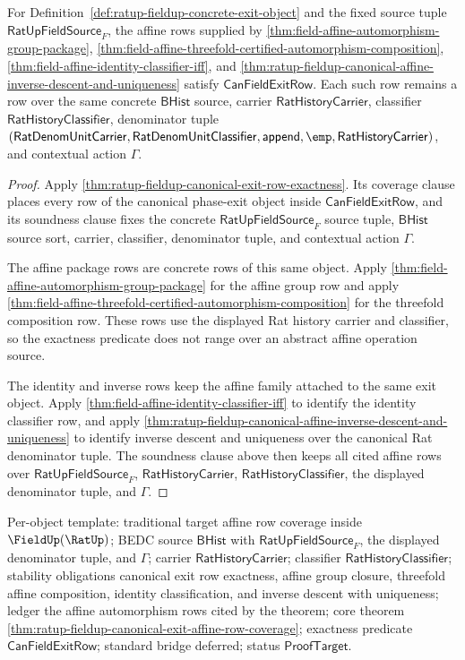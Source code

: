 \begin{theorem}
\label{thm:ratup-fieldup-canonical-exit-affine-row-coverage}
For Definition~\ref{def:ratup-fieldup-concrete-exit-object} and the fixed
source tuple $\mathsf{RatUpFieldSource}_F$, the affine rows supplied by
\autoref{thm:field-affine-automorphism-group-package},
\autoref{thm:field-affine-threefold-certified-automorphism-composition},
\autoref{thm:field-affine-identity-classifier-iff}, and
\autoref{thm:ratup-fieldup-canonical-affine-inverse-descent-and-uniqueness}
satisfy $\mathsf{CanFieldExitRow}$. Each such row remains a row over the same
concrete $\mathsf{BHist}$ source, carrier $\mathsf{RatHistoryCarrier}$,
classifier $\mathsf{RatHistoryClassifier}$, denominator tuple
$(\mathsf{RatDenomUnitCarrier},\mathsf{RatDenomUnitClassifier},
\mathsf{append},\emp,\mathsf{RatHistoryCarrier})$, and contextual action
$\Gamma$.
\end{theorem}
\begin{proof}
Apply \autoref{thm:ratup-fieldup-canonical-exit-row-exactness}. Its coverage
clause places every row of the canonical phase-exit object inside
$\mathsf{CanFieldExitRow}$, and its soundness clause fixes the concrete
$\mathsf{RatUpFieldSource}_F$ source tuple, $\mathsf{BHist}$ source sort, carrier,
classifier, denominator tuple, and contextual action $\Gamma$.

The affine package rows are concrete rows of this same object. Apply
\autoref{thm:field-affine-automorphism-group-package} for the affine group row
and apply
\autoref{thm:field-affine-threefold-certified-automorphism-composition} for the
threefold composition row. These rows use the displayed Rat history carrier and
classifier, so the exactness predicate does not range over an abstract affine
operation source.

The identity and inverse rows keep the affine family attached to the same exit
object. Apply \autoref{thm:field-affine-identity-classifier-iff} to identify the
identity classifier row, and apply
\autoref{thm:ratup-fieldup-canonical-affine-inverse-descent-and-uniqueness} to
identify inverse descent and uniqueness over the canonical Rat denominator
tuple. The soundness clause above then keeps all cited affine rows over
$\mathsf{RatUpFieldSource}_F$, $\mathsf{RatHistoryCarrier}$,
$\mathsf{RatHistoryClassifier}$, the displayed denominator tuple, and $\Gamma$.
\end{proof}

Per-object template: traditional target affine row coverage inside
$\FieldUp(\RatUp)$; BEDC source $\mathsf{BHist}$ with
$\mathsf{RatUpFieldSource}_F$, the displayed denominator tuple, and $\Gamma$;
carrier $\mathsf{RatHistoryCarrier}$; classifier
$\mathsf{RatHistoryClassifier}$; stability obligations canonical exit row
exactness, affine group closure, threefold affine composition, identity
classification, and inverse descent with uniqueness; ledger the affine
automorphism rows cited by the theorem; core theorem
\autoref{thm:ratup-fieldup-canonical-exit-affine-row-coverage}; exactness
predicate $\mathsf{CanFieldExitRow}$; standard bridge deferred; status
$\mathsf{ProofTarget}$.
